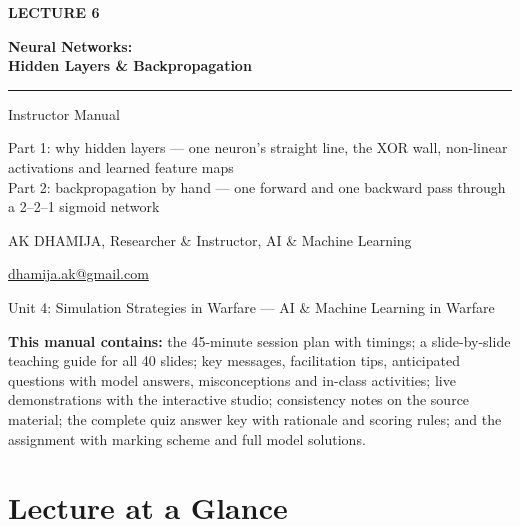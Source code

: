 \documentclass[11pt]{article}
\begin{document}
\begin{titlepage}\centering\vspace*{2.2cm}
{\color{AccN}\large\bfseries LECTURE 6\par}\vspace{0.6cm}
{\color{NavyN}\Huge\bfseries Neural Networks:\\Hidden Layers \& Backpropagation\par}\vspace{0.6cm}
{\color{AccN}\rule{0.7\textwidth}{1.5pt}}\par\vspace{0.6cm}
{\LARGE Instructor Manual\par}\vspace{0.4cm}
{\large\begin{minipage}{0.85\textwidth}\centering Part 1: why hidden layers --- one neuron's straight line, the XOR wall, non-linear activations and learned feature maps\\Part 2: backpropagation by hand --- one forward and one backward pass through a 2--2--1 sigmoid network\end{minipage}\par}\vspace{2cm}
{\large AK DHAMIJA, Researcher \& Instructor, AI \& Machine Learning\par}\vspace{0.2cm}
{\normalsize \href{mailto:dhamija.ak@gmail.com}{dhamija.ak@gmail.com} \quad\textbullet{}\par}\vspace{0.3cm}
{Unit 4: Simulation Strategies in Warfare --- AI \& Machine Learning in Warfare\par}\vfill
\begin{tcolorbox}[colback=NavyN!4,colframe=NavyN,boxrule=0.6pt,arc=2pt,width=0.9\textwidth]\small
\textbf{This manual contains:} the 45-minute session plan with timings; a slide-by-slide teaching guide for all 40 slides; key messages, facilitation tips, anticipated questions with model answers, misconceptions and in-class activities; live demonstrations with the interactive studio; consistency notes on the source material; the complete quiz answer key with rationale and scoring rules; and the assignment with marking scheme and full model solutions.
\end{tcolorbox}
\end{titlepage}
\tableofcontents\newpage


\section{Lecture at a Glance}
\end{document}
